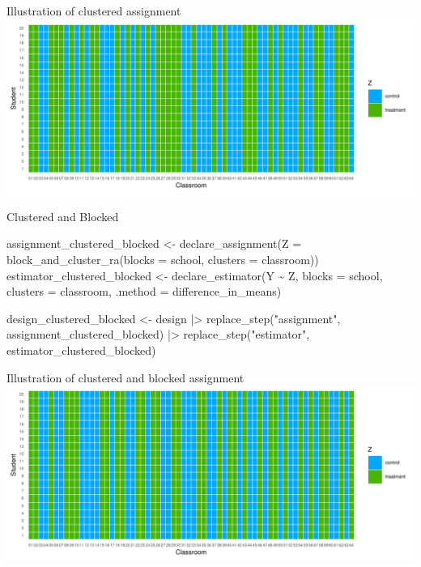 \documentclass[
  11pt,
  ignorenonframetext,
]{beamer}
\newenvironment{Shaded}{\begin{snugshade}}{\end{snugshade}}
\newcommand{\AttributeTok}[1]{\textcolor[rgb]{0.40,0.45,0.13}{#1}}
\newcommand{\FunctionTok}[1]{\textcolor[rgb]{0.28,0.35,0.67}{#1}}
\newcommand{\NormalTok}[1]{\textcolor[rgb]{0.00,0.23,0.31}{#1}}
\newcommand{\OtherTok}[1]{\textcolor[rgb]{0.00,0.23,0.31}{#1}}
\newcommand{\SpecialCharTok}[1]{\textcolor[rgb]{0.37,0.37,0.37}{#1}}
\newcommand{\StringTok}[1]{\textcolor[rgb]{0.13,0.47,0.30}{#1}}
\begin{document}
\begin{frame}{Illustration of clustered assignment}
\protect\hypertarget{illustration-of-clustered-assignment}{}
\includegraphics{0_lectures_files/figure-beamer/unnamed-chunk-402-1.pdf}
\end{frame}

\begin{frame}[fragile]{Clustered and Blocked}
\protect\hypertarget{clustered-and-blocked}{}
\begin{Shaded}
\begin{Highlighting}[]
\NormalTok{assignment\_clustered\_blocked }\OtherTok{\textless{}{-}}   
  \FunctionTok{declare\_assignment}\NormalTok{(}\AttributeTok{Z =} \FunctionTok{block\_and\_cluster\_ra}\NormalTok{(}\AttributeTok{blocks =}\NormalTok{ school,}
                                              \AttributeTok{clusters =}\NormalTok{ classroom))  }
\NormalTok{estimator\_clustered\_blocked }\OtherTok{\textless{}{-}} 
  \FunctionTok{declare\_estimator}\NormalTok{(Y }\SpecialCharTok{\textasciitilde{}}\NormalTok{ Z, }\AttributeTok{blocks =}\NormalTok{ school, }\AttributeTok{clusters =}\NormalTok{ classroom, }
                    \AttributeTok{.method =}\NormalTok{ difference\_in\_means)  }


\NormalTok{design\_clustered\_blocked }\OtherTok{\textless{}{-}} 
\NormalTok{  design }\SpecialCharTok{|\textgreater{}} 
  \FunctionTok{replace\_step}\NormalTok{(}\StringTok{"assignment"}\NormalTok{, assignment\_clustered\_blocked) }\SpecialCharTok{|\textgreater{}} 
  \FunctionTok{replace\_step}\NormalTok{(}\StringTok{"estimator"}\NormalTok{, estimator\_clustered\_blocked)}
\end{Highlighting}
\end{Shaded}
\end{frame}

\begin{frame}{Illustration of clustered and blocked assignment}
\protect\hypertarget{illustration-of-clustered-and-blocked-assignment}{}
\includegraphics{0_lectures_files/figure-beamer/unnamed-chunk-404-1.pdf}
\end{frame}
\end{document}
